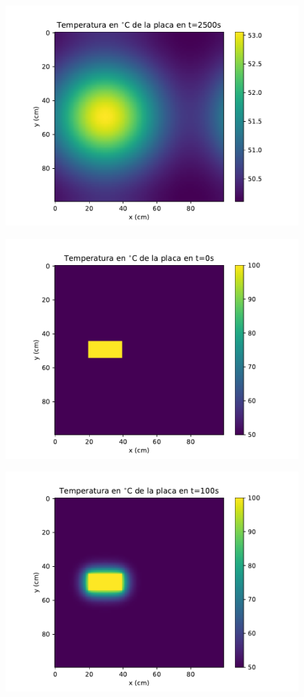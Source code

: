 \documentclass[12pt,letterpaper]{article}
\begin{document}
\begin{figure}[h]
\includegraphics{p1_2500.pdf}
\centering
\end{figure}

\begin{figure}[h]
\includegraphics{p2_0.pdf}
\centering
\end{figure}

\begin{figure}[h]
\includegraphics{p2_100.pdf}
\centering
\end{figure}
\end{document}
